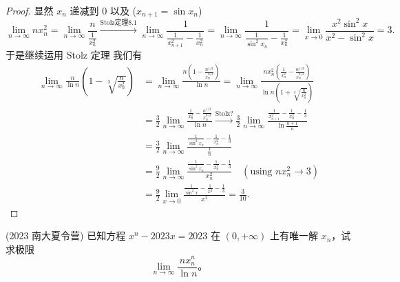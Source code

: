 \documentclass[lang=cn,10pt,thmcnt=section]{elegantbook}
\begin{document}
\begin{proof}
	显然 $x_n$ 递减到 0 以及 ($x_{n+1} = \sin x_n$)
    $$
    \lim_{n \to \infty} n x_n^2 = \lim_{n \to \infty} \frac{n}{\frac{1}{x_n^2}} \xrightarrow{\text{Stolz定理8.1}} \lim_{n \to \infty} \frac{1}{\frac{1}{x_{n+1}^2} - \frac{1}{x_n^2}} = \lim_{n \to \infty} \frac{1}{\frac{1}{\sin^2 x_n} - \frac{1}{x_n^2}} = \lim_{x \to 0} \frac{x^2 \sin^2 x}{x^2 - \sin^2 x} = 3.
    $$
    于是继续运用 Stolz 定理 我们有
    \begin{align*}
        \lim_{n \to \infty} \frac{n}{\ln n} \left(1 - \sqrt[3]{\frac{n}{x_n^2}}\right) &= \lim_{n \to \infty} \frac{n \left(1 - \frac{n^{1/3}}{x_n^{2/3}}\right)}{\ln n} = \lim_{n \to \infty} \frac{n x_n^2 \left(\frac{1}{x_n^2} - \frac{n^{1/3}}{x_n^{8/3}}\right)}{\ln n \left(1 + \sqrt[3]{\frac{n}{x_n^2}}\right)} \\ %
        &= \frac{3}{2} \lim_{n \to \infty} \frac{\frac{1}{x_n^2} - \frac{n^{1/3}}{x_n^{8/3}}}{\ln n} \xrightarrow{\text{Stolz?}} \frac{3}{2} \lim_{n \to \infty} \frac{\frac{1}{x_{n+1}^2} - \frac{1}{x_n^2} - \frac{1}{3}}{\ln \frac{n+1}{n}} \\
        &= \frac{3}{2} \lim_{n \to \infty} \frac{\frac{1}{\sin^2 x_n} - \frac{1}{x_n^2} - \frac{1}{3}}{\frac{1}{n}} \\
        &= \frac{9}{2} \lim_{n \to \infty} \frac{\frac{1}{\sin^2 x_n} - \frac{1}{x_n^2} - \frac{1}{3}}{x_n^2} \quad (\text{using } nx_n^2 \to 3) \\
        &= \frac{9}{2} \lim_{x \to 0} \frac{\frac{1}{\sin^2 x} - \frac{1}{x^2} - \frac{1}{3}}{x^2} = \frac{3}{10}.
    \end{align*}
\end{proof}
\begin{example}
	(2023 南大夏令营) 已知方程 $x^n - 2023x = 2023$ 在 $(0,+\infty)$ 上有唯一解 $x_n$，试求极限
\[
\lim_{n\to\infty}\frac{nx_n^n}{\ln n}。
\]
\end{example}
\end{document}
